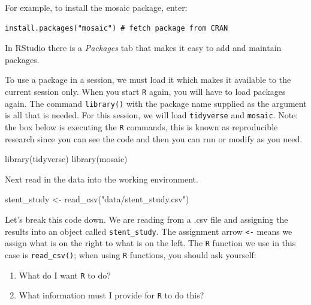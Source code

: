 \documentclass[
]{book}
\newenvironment{Shaded}{\begin{snugshade}}{\end{snugshade}}
\newcommand{\FunctionTok}[1]{\textcolor[rgb]{0.00,0.00,0.00}{#1}}
\newcommand{\NormalTok}[1]{#1}
\newcommand{\OtherTok}[1]{\textcolor[rgb]{0.56,0.35,0.01}{#1}}
\newcommand{\StringTok}[1]{\textcolor[rgb]{0.31,0.60,0.02}{#1}}
\begin{document}
For example, to install the mosaic package, enter:

\begin{verbatim}
install.packages("mosaic") # fetch package from CRAN
\end{verbatim}

In RStudio there is a \emph{Packages} tab that makes it easy to add and maintain packages.

To use a package in a session, we must load it which makes it available to the current session only. When you start \texttt{R} again, you will have to load packages again. The command \texttt{library()} with the package name supplied as the argument is all that is needed. For this session, we will load \texttt{tidyverse} and \texttt{mosaic}. Note: the box below is executing the \texttt{R} commands, this is known as reproducible research since you can see the code and then you can run or modify as you need.

\begin{Shaded}
\begin{Highlighting}[]
\FunctionTok{library}\NormalTok{(tidyverse)}
\FunctionTok{library}\NormalTok{(mosaic)}
\end{Highlighting}
\end{Shaded}

Next read in the data into the working environment.

\begin{Shaded}
\begin{Highlighting}[]
\NormalTok{stent\_study }\OtherTok{\textless{}{-}} \FunctionTok{read\_csv}\NormalTok{(}\StringTok{"data/stent\_study.csv"}\NormalTok{)}
\end{Highlighting}
\end{Shaded}

Let's break this code down. We are reading from a .csv file and assigning the results into an object called \texttt{stent\_study}. The assignment arrow \texttt{\textless{}-} means we assign what is on the right to what is on the left. The \texttt{R} function we use in this case is \texttt{read\_csv()}; when using \texttt{R} functions, you should ask yourself:

\begin{enumerate}
\def\labelenumi{\arabic{enumi}.}
\item
  What do I want \texttt{R} to do?
\item
  What information must I provide for \texttt{R} to do this?
\end{enumerate}
\end{document}
